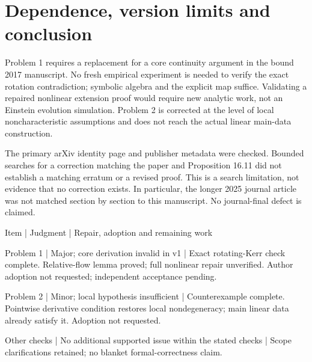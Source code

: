 \documentclass[10pt]{article}
\begin{document}
\section*{Dependence, version limits and conclusion}
Problem 1 requires a replacement for a core continuity argument in the bound 2017 manuscript. No fresh empirical experiment is needed to verify the exact rotation contradiction; symbolic algebra and the explicit map suffice. Validating a repaired nonlinear extension proof would require new analytic work, not an Einstein evolution simulation. Problem 2 is corrected at the level of local noncharacteristic assumptions and does not reach the actual linear main-data construction.\par
The primary arXiv identity page and publisher metadata were checked. Bounded searches for a correction matching the paper and Proposition 16.11 did not establish a matching erratum or a revised proof. This is a search limitation, not evidence that no correction exists. In particular, the longer 2025 journal article was not matched section by section to this manuscript. No journal-final defect is claimed.\par
Item | Judgment | Repair, adoption and remaining work\par
Problem 1 | Major; core derivation invalid in v1 | Exact rotating-Kerr check complete. Relative-flow lemma proved; full nonlinear repair unverified. Author adoption not requested; independent acceptance pending.\par
Problem 2 | Minor; local hypothesis insufficient | Counterexample complete. Pointwise derivative condition restores local nondegeneracy; main linear data already satisfy it. Adoption not requested.\par
Other checks | No additional supported issue within the stated checks | Scope clarifications retained; no blanket formal-correctness claim.\par
\end{document}
